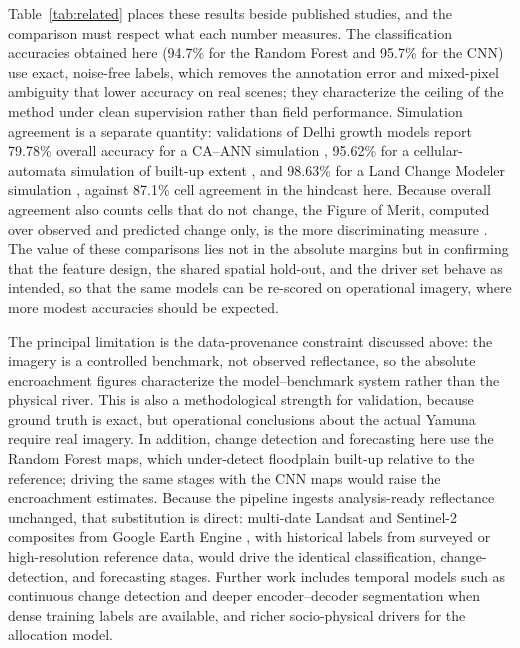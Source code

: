 \documentclass[journal]{IEEEtran}
\begin{document}
Table~\ref{tab:related} places these results beside published studies, and the comparison must respect what each number measures. The classification accuracies obtained here (94.7\% for the Random Forest and 95.7\% for the CNN) use exact, noise-free labels, which removes the annotation error and mixed-pixel ambiguity that lower accuracy on real scenes; they characterize the ceiling of the method under clean supervision rather than field performance. Simulation agreement is a separate quantity: validations of Delhi growth models report 79.78\% overall accuracy for a CA--ANN simulation \cite{jain2024future}, 95.62\% for a cellular-automata simulation of built-up extent \cite{tripathy2019monitoring}, and 98.63\% for a Land Change Modeler simulation \cite{singh2022land}, against 87.1\% cell agreement in the hindcast here. Because overall agreement also counts cells that do not change, the Figure of Merit, computed over observed and predicted change only, is the more discriminating measure \cite{pontius2008comparing}. The value of these comparisons lies not in the absolute margins but in confirming that the feature design, the shared spatial hold-out, and the driver set behave as intended, so that the same models can be re-scored on operational imagery, where more modest accuracies should be expected.

The principal limitation is the data-provenance constraint discussed above: the imagery is a controlled benchmark, not observed reflectance, so the absolute encroachment figures characterize the model--benchmark system rather than the physical river. This is also a methodological strength for validation, because ground truth is exact, but operational conclusions about the actual Yamuna require real imagery. In addition, change detection and forecasting here use the Random Forest maps, which under-detect floodplain built-up relative to the reference; driving the same stages with the CNN maps would raise the encroachment estimates. Because the pipeline ingests analysis-ready reflectance unchanged, that substitution is direct: multi-date Landsat \cite{wulder2019current} and Sentinel-2 \cite{drusch2012sentinel} composites from Google Earth Engine \cite{gorelick2017gee}, with historical labels from surveyed or high-resolution reference data, would drive the identical classification, change-detection, and forecasting stages. Further work includes temporal models such as continuous change detection \cite{zhu2014continuous} and deeper encoder--decoder segmentation \cite{ronneberger2015unet} when dense training labels are available, and richer socio-physical drivers for the allocation model.
\end{document}
